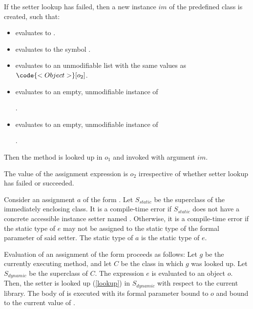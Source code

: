 \documentclass[makeidx]{article}
\begin{document}
\LMHash{}%
If the setter lookup has failed, then a new instance $im$ of the predefined class  is created, such that:
\begin{itemize}
\item {} evaluates to \code{\TRUE{}}.
\item {} evaluates to the symbol .
\item {} evaluates to an unmodifiable list with the same values as
$\code{<Object>}[o_2]$.
\item {} evaluates to an empty, unmodifiable instance of

.
\item {} evaluates to an empty, unmodifiable instance of

.
\end{itemize}

\LMHash{}%
Then the method  is looked up in $o_1$ and invoked with argument $im$.


\LMHash{}%
The value of the assignment expression is $o_2$ irrespective of whether setter lookup has failed or succeeded.

\LMHash{}%
Consider an assignment $a$ of the form .
Let $S_{static}$ be the superclass of the immediately enclosing class.
It is a compile-time error if $S_{static}$ does not have a concrete accessible instance setter named .
Otherwise, it is a compile-time error if the static type of $e$
may not be assigned to the static type of the formal parameter of said setter.
The static type of $a$ is the static type of $e$.

\LMHash{}%
Evaluation of an assignment of the form 
proceeds as follows:
Let $g$ be the currently executing method, and let $C$ be the class in which $g$ was looked up.
Let $S_{dynamic}$ be the superclass of $C$.
The expression $e$ is evaluated to an object $o$.
Then, the setter  is looked up (\ref{lookup}) in $S_{dynamic}$ with respect to the current library.
The body of  is executed with its formal parameter bound to $o$
and \THIS{} bound to the current value of \THIS{}.

\end{document}
